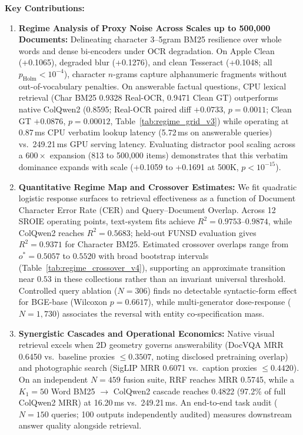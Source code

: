\textbf{Key Contributions:}
\begin{enumerate}
    \setlength{\itemsep}{0.2pt plus 0.1pt}
    \setlength{\parskip}{0pt}
    \item \textbf{Regime Analysis of Proxy Noise Across Scales up to 500,000 Documents:} Delineating character 3--5gram BM25 resilience over whole words and dense bi-encoders under OCR degradation. On Apple Clean (+0.1065), degraded blur (+0.1276), and clean Tesseract (+0.1048; all $p_{\text{Holm}} < 10^{-4}$), character $n$-grams capture alphanumeric fragments without out-of-vocabulary penalties. On answerable factual questions, CPU lexical retrieval (Char BM25 0.9328 Real-OCR, 0.9471 Clean GT) outperforms native ColQwen2 (0.8595; Real-OCR paired diff $+0.0733$, $p = 0.0011$; Clean GT $+0.0876$, $p = 0.00012$, Table~\ref{tab:regime_grid_v3}) while operating at 0.87\,ms CPU verbatim lookup latency (5.72\,ms on answerable queries) vs.\ 249.21\,ms GPU serving latency. Evaluating distractor pool scaling across a $600\times$ expansion (813 to 500,000 items) demonstrates that this verbatim dominance expands with scale (+0.1059 to +0.1691 at 500K, $p < 10^{-15}$).
    \item \textbf{Quantitative Regime Map and Crossover Estimates:} We fit quadratic logistic response surfaces to retrieval effectiveness as a function of Document Character Error Rate (CER) and Query--Document Overlap. Across 12 SROIE operating points, text-system fits achieve $R^2=0.9753$--$0.9874$, while ColQwen2 reaches $R^2=0.5683$; held-out FUNSD evaluation gives $R^2=0.9371$ for Character BM25. Estimated crossover overlaps range from $o^*=0.5057$ to $0.5520$ with broad bootstrap intervals (Table~\ref{tab:regime_crossover_v4}), supporting an approximate transition near $0.53$ in these collections rather than an invariant universal threshold. Controlled query ablation ($N=306$) finds no detectable syntactic-form effect for BGE-base (Wilcoxon $p=0.6617$), while multi-generator dose-response ($N=1{,}730$) associates the reversal with entity co-specification mass.
    \item \textbf{Synergistic Cascades and Operational Economics:} Native visual retrieval excels when 2D geometry governs answerability (DocVQA MRR 0.6450 vs.\ baseline proxies $\le 0.3507$, noting disclosed pretraining overlap) and photographic search (SigLIP MRR 0.6071 vs.\ caption proxies $\le 0.4420$). On an independent $N=459$ fusion suite, RRF reaches MRR 0.5745, while a $K_1=50$ Word BM25 $\to$ ColQwen2 cascade reaches 0.4822 (97.2\% of full ColQwen2 MRR) at 16.20\,ms vs.\ 249.21\,ms. An end-to-end task audit ($N=150$ queries; 100 outputs independently audited) measures downstream answer quality alongside retrieval.
\end{enumerate}

